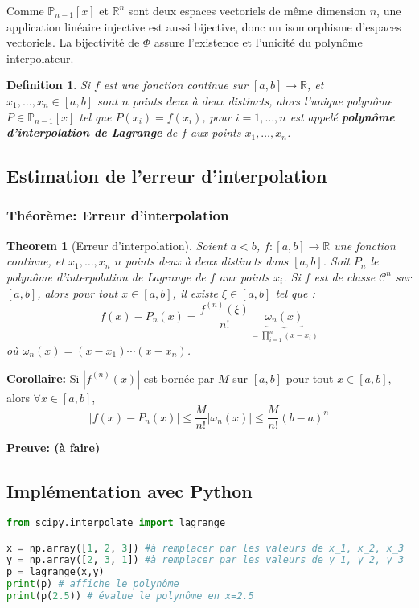 \documentclass{article}
\newtheorem{theorem}{Theorem}
\newtheorem{definition}{Definition}
\begin{document}
Comme $\mathbb{P}_{n-1}[x]$ et $\mathbb{R}^n$ sont deux espaces vectoriels de même dimension $n$, une application linéaire injective est aussi bijective, donc un isomorphisme d'espaces vectoriels. La bijectivité de $\Phi$ assure l'existence et l'unicité du polynôme interpolateur.

\begin{definition}
Si $f$ est une fonction continue sur $[a,b] \to \mathbb{R}$, et $x_1, \dots, x_n \in [a,b]$ sont $n$ points deux à deux distincts, alors l'unique polynôme $P \in \mathbb{P}_{n-1}[x]$ tel que $P(x_i) = f(x_i)$, pour $i=1, \dots, n$ est appelé \textbf{polynôme d'interpolation de Lagrange} de $f$ aux points $x_1, \dots, x_n$.
\end{definition}

\subsection{Estimation de l'erreur d'interpolation}

\subsubsection{Théorème: Erreur d'interpolation}

\begin{theorem}[Erreur d'interpolation]
Soient $a < b$, $f: [a,b] \to \mathbb{R}$ une fonction continue, et $x_1, \dots, x_n$ $n$ points deux à deux distincts dans $[a,b]$.
Soit $P_n$ le polynôme d'interpolation de Lagrange de $f$ aux points $x_i$.
Si $f$ est de classe $\mathcal{C}^n$ sur $[a,b]$, alors pour tout $x \in [a,b]$, il existe $\xi \in [a,b]$ tel que :
\[
f(x) - P_n(x) = \frac{f^{(n)}(\xi)}{n!} \underbrace{\omega_n(x)}_{= \prod_{i=1}^n (x-x_i)}
\]
où $\omega_n(x) = (x-x_1) \cdots (x-x_n)$.
\end{theorem}

\textbf{Corollaire:}
Si $|f^{(n)}(x)|$ est bornée par $M$ sur $[a,b]$ pour tout $x \in [a,b]$, alors $\forall x \in [a,b]$,
\[
|f(x) - P_n(x)| \le \frac{M}{n!} |\omega_n(x)| \le \frac{M}{n!} (b-a)^n
\]

\textbf{Preuve: (à faire)}

\subsection{Implémentation avec Python}

\begin{lstlisting}[language=Python]
from scipy.interpolate import lagrange

x = np.array([1, 2, 3]) #à remplacer par les valeurs de x_1, x_2, x_3
y = np.array([2, 3, 1]) #à remplacer par les valeurs de y_1, y_2, y_3
p = lagrange(x,y)
print(p) # affiche le polynôme
print(p(2.5)) # évalue le polynôme en x=2.5
\end{lstlisting}
\end{document}
